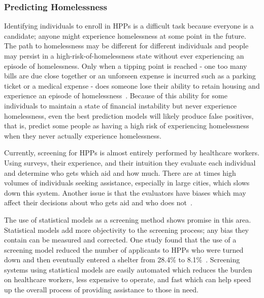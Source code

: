 \documentclass[10pt,letterpaper]{article}
\begin{document}
\subsubsection*{Predicting Homelessness}
Identifying individuals to enroll in HPPs is a difficult task because everyone is a candidate; anyone might experience homelessness at some point in the future. The path to homelessness may be different for different individuals and people may persist in a high-risk-of-homelessness state without ever experiencing an episode of homelessness. Only when a tipping point is reached - one too many bills are due close together or an unforseen expense is incurred such as a parking ticket or a medical expense - does someone lose their ability to retain housing and experience an episode of homelessness~\cite{o2004wrong}. Because of this ability for some individuals to maintain a state of financial instability but never experience homelessness, even the best prediction models will likely produce false positives, that is, predict some people as having a high risk of experiencing homelessness when they never actually experience homelessness.

Currently, screening for HPPs is almost entirely performed by healthcare workers. Using surveys, their experience, and their intuition they evaluate each individual and determine who gets which aid and how much. There are at times high volumes of individuals seeking assistance, especially in large cities, which slows down this system. Another issue is that the evaluators have biases which may affect their decisions about who gets aid and who does not~\cite{shinn2019homelessness}.

The use of statistical models as a screening method shows promise in this area. Statistical models add more objectivity to the screening process; any bias they contain can be measured and corrected. One study found that the use of a screening model reduced the number of applicants to HPPs who were turned down and then eventually entered a shelter from 28.4\% to 8.1\%~\cite{shinn2019homelessness}. Screening systems using statistical models are easily automated which reduces the burden on healthcare workers, less expensive to operate, and fast which can help speed up the overall process of providing assistance to those in need.
\end{document}
